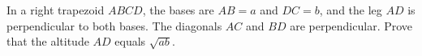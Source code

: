 In a right trapezoid $ABCD$, the bases are $AB=a$ and $DC=b$, and the leg $AD$ is perpendicular to both bases. The diagonals $AC$ and $BD$ are perpendicular. Prove that the altitude $AD$ equals $\sqrt{ab}$.
